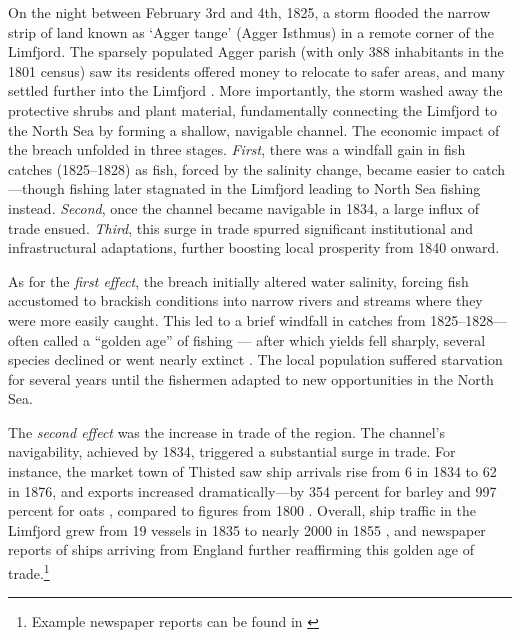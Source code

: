 \documentclass[12pt]{article}
\begin{document}
On the night between February 3rd and 4th, 1825, a storm flooded the narrow strip of land known as ‘Agger tange’ (Agger Isthmus) in a remote corner of the Limfjord. The sparsely populated Agger parish (with only 388 inhabitants in the 1801 census) saw its residents offered money to relocate to safer areas, and many settled further into the Limfjord \citep{Poulsen2019, Poulsen2022}. More importantly, the storm washed away the protective shrubs and plant material, fundamentally connecting the Limfjord to the North Sea by forming a shallow, navigable channel. The economic impact of the breach unfolded in three stages. \textit{First}, there was a windfall gain in fish catches (1825–1828) as fish, forced by the salinity change, became easier to catch—though fishing later stagnated in the Limfjord leading to North Sea fishing instead. \textit{Second}, once the channel became navigable in 1834, a large influx of trade ensued. \textit{Third}, this surge in trade spurred significant institutional and infrastructural adaptations, further boosting local prosperity from 1840 onward.

As for the \textit{first effect}, the breach initially altered water salinity, forcing fish accustomed to brackish conditions into narrow rivers and streams where they were more easily caught. This led to a brief windfall in catches from 1825–1828—often called a “golden age” of fishing \citep{Poulsen2007} — after which yields fell sharply, several species declined or went nearly extinct \citep{Poulsen2019}. The local population suffered starvation for several years until the fishermen adapted to new opportunities in the North Sea. 

The \textit{second effect} was the increase in trade of the region. The channel’s navigability, achieved by 1834, triggered a substantial surge in trade. For instance, the market town of Thisted saw ship arrivals rise from 6 in 1834 to 62 in 1876, and exports increased dramatically—by 354 percent for barley and 997 percent for oats \citep[p. 153-159]{ThistedLokalhistorie1974}, compared to figures from 1800 \citep{Aagard1802}. Overall, ship traffic in the Limfjord grew from 19 vessels in 1835 to nearly 2000 in 1855 \citep{Svalgaard1977}, and newspaper reports of ships arriving from England further reaffirming this golden age of trade.\footnote{Example newspaper reports can be found in \citet{ThistedAmtsavis1834, RoskildeAmt1836, ViborgStift1852}}
\end{document}
